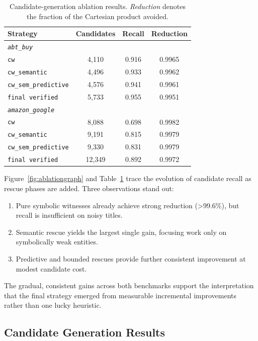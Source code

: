 \documentclass[10pt,twocolumn]{article}
\begin{document}
\begin{table}[t]
\centering
\caption{Candidate-generation ablation results. \emph{Reduction} denotes the
  fraction of the Cartesian product avoided.}
\label{tab:ablation}
\small
\begin{tabular}{lccc}
\toprule
Strategy & Candidates & Recall & Reduction \\
\midrule
\multicolumn{4}{l}{\textit{\texttt{abt\_buy}}} \\
\texttt{cw}                  & 4,110  & 0.916 & 0.9965 \\
\texttt{cw\_semantic}        & 4,496  & 0.933 & 0.9962 \\
\texttt{cw\_sem\_predictive} & 4,576  & 0.941 & 0.9961 \\
\texttt{final verified}      & 5,733  & 0.955 & 0.9951 \\
\midrule
\multicolumn{4}{l}{\textit{\texttt{amazon\_google}}} \\
\texttt{cw}                  & 8,088  & 0.698 & 0.9982 \\
\texttt{cw\_semantic}        & 9,191  & 0.815 & 0.9979 \\
\texttt{cw\_sem\_predictive} & 9,330  & 0.831 & 0.9979 \\
\texttt{final verified}      & 12,349 & 0.892 & 0.9972 \\
\bottomrule
\end{tabular}
\end{table}

Figure~\ref{fig:ablationgraph} and Table~\ref{tab:ablation} trace the
evolution of candidate recall as rescue phases are added. Three observations
stand out:
\begin{enumerate}
  \item Pure symbolic witnesses already achieve strong reduction (>99.6\%),
    but recall is insufficient on noisy titles.
  \item Semantic rescue yields the largest single gain, focusing work only on
    symbolically weak entities.
  \item Predictive and bounded rescues provide further consistent improvement
    at modest candidate cost.
\end{enumerate}

The gradual, consistent gains across both benchmarks support the
interpretation that the final strategy emerged from measurable incremental
improvements rather than one lucky heuristic.

\subsection{Candidate Generation Results}
\end{document}
